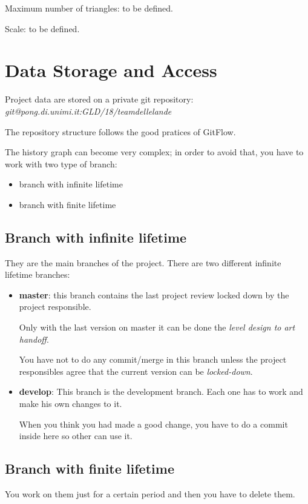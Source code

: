 \documentclass[12pt]{article}
\begin{document}
Maximum number of triangles: to be defined.

Scale: to be defined.

\section{Data Storage and Access}
Project data are stored on a private git repository:\\
	\textit{git@pong.di.unimi.it:GLD/18/teamdellelande}

The repository structure follows the good pratices of GitFlow.

The history graph can become very complex; in order to avoid that, you have to work with two type of branch:
\begin{itemize}
	\item branch with infinite lifetime
	\item branch with finite lifetime
\end{itemize}

\subsection{Branch with infinite lifetime}
They are the main branches of the project. There are two different infinite lifetime branches:
\begin{itemize}
\item \textbf{master}: this branch contains the last project review locked down by the project responsible.
    
  Only with the last version on master it can be done the \textit{level design to art handoff}.
  
  You have not to do any commit/merge in this branch unless the project responsibles agree that the current version can be \textit{locked-down}.
  
\item \textbf{develop}: This branch is the development branch. Each one has to work and make his own changes to it.
  
  When you think you had made a good change, you have to do a commit inside here so other can use it.
\end{itemize}

\subsection{Branch with finite lifetime}
You work on them just for a certain period and then you have to delete them.
\end{document}
